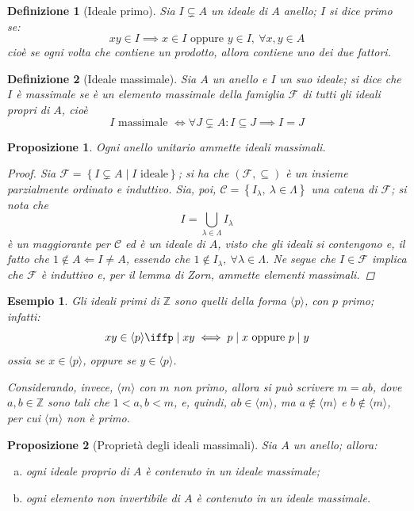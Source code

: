 \documentclass[11pt]{scrartcl}
\theoremstyle{style1}
\newtheorem{prop}{Proposizione}[section]
\newtheorem{definizione}{Definizione}[section]
\newtheorem{esempio}{Esempio}[section]
\numberwithin{equation}{subsection}
\begin{document}
\begin{definizione}
	[Ideale primo]
	Sia $I \subsetneq A$ un ideale di $A$ anello; $I$ si dice \textit{primo} se:
	\[
	xy \in I \implies x \in I \text{ oppure } y\in I, \ \forall x,y \in A
	\] 
	cio\`e se ogni volta che contiene un prodotto, allora contiene uno dei due fattori.
\end{definizione}
\begin{definizione}
	[Ideale massimale]
	Sia $A$ un anello e $I$ un suo ideale; si dice che $I$ \`e \textit{massimale} se \`e un elemento massimale della famiglia $\mathcal{F} $ di tutti gli ideali propri di $A$, cio\`e
	\[
	I \text{ massimale }\iff\forall J\subsetneq A : I \subseteq J \implies I = J
	\] 
\end{definizione}
\begin{prop}
	Ogni anello unitario ammette ideali massimali.
	\begin{proof}
		Sia $\mathcal{F} = \left\{ I \subsetneq A  \mid I \text{ ideale} \right\}  $; si ha che $(\mathcal{F} ,\subseteq)$ \`e un insieme parzialmente ordinato e induttivo.
		Sia, poi, $\mathcal{C} = \left\{ I_\lambda , \ \lambda \in \Lambda  \right\} $ una catena di $\mathcal{F} $; si nota che
		\[
		I = \bigcup_{\lambda \in \Lambda } I_\lambda 
		\] 
		\`e un maggiorante per $\mathcal{C} $ ed \`e un ideale di $A$, visto che gli ideali si contengono e, il fatto che $1 \not\in A\Leftarrow I\neq A$, essendo che $1\not \in I_\lambda , \ \forall \lambda \in \Lambda $.
		Ne segue che $I \in \mathcal{F} $ implica che $\mathcal{F} $ \`e induttivo e, per il lemma di Zorn, ammette elementi massimali.
	\end{proof}
\end{prop}
\begin{esempio}
Gli ideali primi di $\mathbb{Z}$ sono quelli della forma $\langle p \rangle$, con $p$ primo; infatti:
\[
xy \in \langle p \rangle \iffp  \mid xy \iff p \mid x \text{ oppure }p  \mid y
\] 
ossia se $x \in \langle p \rangle$, oppure se $y \in \langle p \rangle$.

Considerando, invece, $\langle m \rangle$ con $m$ non primo, allora si pu\`o scrivere $m = ab$, dove $a,b \in \mathbb{Z}$ sono tali che $1<a,b<m$, e, quindi, $ab \in \langle m \rangle$, ma $a \not \in \langle m \rangle$ e $b \not \in \langle m \rangle$, per cui $\langle m \rangle$ non \`e primo.
\end{esempio}
\begin{prop}
	[Propriet\`a degli ideali massimali]
	Sia $A$ un anello; allora:
	\begin{enumerate}[(a).]
		\item ogni ideale proprio di $A$ \`e contenuto in un ideale massimale;
		\item ogni elemento non invertibile di $A$ \`e contenuto in un ideale massimale.
	\end{enumerate}
\end{prop}
\end{document}
